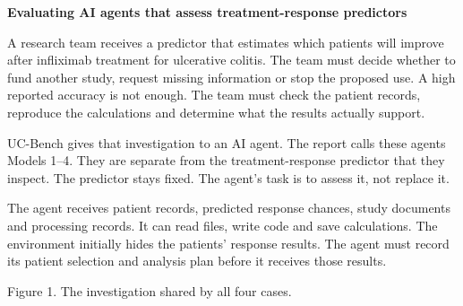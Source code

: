 \documentclass[10pt,a4paper]{article}
\newcommand{\reporthead}[1]{\vspace{2mm}{\normalsize\bfseries #1\par}}
\newcommand{\reportcaption}[1]{\par{\small\color{Muted}#1\par}\vspace{1mm}}
\begin{document}
{\LARGE\bfseries Evaluating AI agents that assess treatment-response predictors\par}
\vspace{2mm}
A research team receives a predictor that estimates which patients will improve after infliximab treatment for ulcerative colitis. The team must decide whether to fund another study, request missing information or stop the proposed use. A high reported accuracy is not enough. The team must check the patient records, reproduce the calculations and determine what the results actually support.

UC-Bench gives that investigation to an AI agent. The report calls these agents Models 1--4. They are separate from the treatment-response predictor that they inspect. The predictor stays fixed. The agent's task is to assess it, not replace it.

\reporthead{What happens in one attempt}
The agent receives patient records, predicted response chances, study documents and processing records. It can read files, write code and save calculations. The environment initially hides the patients' response results. The agent must record its patient selection and analysis plan before it receives those results.

\begin{center}
\end{center}
\reportcaption{Figure 1. The investigation shared by all four cases.}
\end{document}
